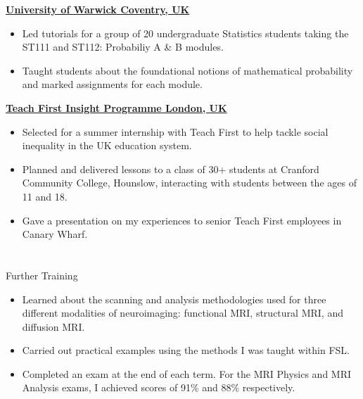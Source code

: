 \documentclass{my_cv}
\begin{document}
\vspace{0.2cm}
\uline{\large\bfseries{University of Warwick}  \hfill \large\bfseries{Coventry, UK}}
{\begin{addmargin}[2em]{0em}
    \begin{itemize}[topsep=0pt,itemsep=0pt,partopsep=0pt, parsep=0pt] 
    \item Led tutorials for a group of 20 undergraduate Statistics students taking the ST111 and ST112: Probabiliy A \& B modules.
    \item Taught students about the foundational notions of mathematical probability and marked assignments for each module.
     \end{itemize}
\end{addmargin}}
\vspace{0.2cm}
\uline{\large\bfseries{Teach First Insight Programme}  \hfill \large\bfseries{London, UK}}
{\begin{addmargin}[2em]{0em}
    \begin{itemize}[topsep=0pt,itemsep=0pt,partopsep=0pt, parsep=0pt] 
    \item Selected for a summer internship with Teach First to help tackle social inequality in the UK education system.
    \item Planned and delivered lessons to a class of 30+ students at Cranford Community College, Hounslow, interacting with students between the ages of 11 and 18.  
    \item Gave a presentation on my experiences to senior Teach First employees in Canary Wharf. 
     \end{itemize}
\end{addmargin}}

   
\section{\faPencil}{Further Training}

%
    {\begin{itemize}[topsep=0pt,itemsep=0pt,partopsep=0pt, parsep=0pt] 
    \item Learned about the scanning and analysis methodologies used for three different modalities of neuroimaging: functional MRI, structural MRI, and diffusion MRI.  
    \item Carried out practical examples using the methods I was taught within FSL. 
    \item Completed an exam at the end of each term. For the MRI Physics and MRI Analysis exams, I achieved scores of 91\% and 88\% respectively. 
    \end{itemize}
    }%
\end{document}
